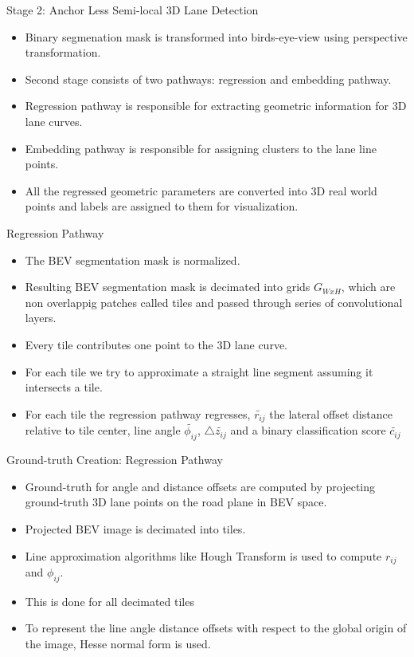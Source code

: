 \documentclass[aspectratio=169]{beamer}
\begin{document}
\begin{frame}{Stage 2: Anchor Less Semi-local 3D Lane Detection}
\begin{itemize}
    \item Binary segmenation mask is transformed into birds-eye-view using perspective transformation.
    \item Second stage consists of two pathways: regression and embedding pathway.
    \item Regression pathway is responsible for extracting geometric information for 3D lane curves.
    \item Embedding pathway is responsible for assigning clusters to the lane line points.
    \item All the regressed geometric parameters are converted into 3D real world points and labels are assigned to them for visualization.
\end{itemize}
\end{frame}

\begin{frame}{Regression Pathway}    
    \begin{itemize}
        \item The BEV segmentation mask is normalized.
        \item Resulting BEV segmentation mask is decimated into grids $G_{WxH}$, which are non overlappig patches called tiles and passed through series of convolutional layers.
        \item Every tile contributes one point to the 3D lane curve.
        \item For each tile we try to approximate a straight line segment assuming it intersects a tile.
        \item For each tile the regression pathway regresses, $\widetilde{r_{ij}}$ the lateral offset distance relative to tile center, line angle $\widetilde{\phi_{ij}}$, $\triangle{\widetilde{z_{ij}}}$ and a binary classification score $\widetilde{c_{ij}}$ 
    \end{itemize}
    
\end{frame}

\begin{frame}{Ground-truth Creation: Regression Pathway}
    \begin{itemize}
        \item  Ground-truth for angle and distance offsets are computed by projecting ground-truth 3D lane points on the road plane in BEV space.
        \item Projected BEV image is decimated into tiles.
        \item Line approximation algorithms like Hough Transform is used to compute $r_{ij}$ and $\phi_{ij}$.
        \item This is done for all decimated tiles
        \item To represent the line angle distance offsets with respect to the global origin of the image, Hesse normal form is used.
    \end{itemize}

     
\end{frame}
\end{document}
